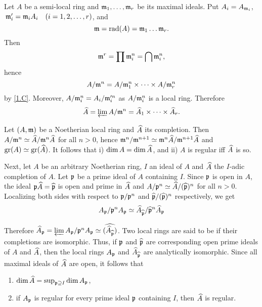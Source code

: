 \documentclass[../main]{subfiles}
\begin{document}
\newparagraph Let $A$ be a semi-local ring and $\mathfrak{m}_1, \dots, \mathfrak{m}_r$ be its maximal ideals. Put $A_i = A_{\mathfrak{m}_i}$, $\,{\ideal m}_i' = {\ideal m}_i A_i\for{i = 1, 2, \ldots, r}$, and \[\mathfrak{m} = \operatorname{rad}(A) = \mathfrak{m}_1 \dots \mathfrak{m}_r.\] Then \[{\mathfrak{m}}^r = \prod \mathfrak{m}_i^n = \bigcap \mathfrak{m}_i^n,\] hence \[A/\mathfrak{m}^n = A/\mathfrak{m}_1^n \times \dots \times A/\mathfrak{m}_r^n\] by \ref{1.C}. Moreover, $A/\mathfrak{m}_i^n = A_i/\mathfrak{m}_i'^n$ as $A/\mathfrak{m}_i^n$ is a local ring. Therefore
\[
\widehat{A} = \varprojlim A/\mathfrak{m}^n = \widehat{A}_1 \times \dots \times \widehat{A}_r.
\]

\newparagraph Let $(A, \mathfrak{m})$ be a Noetherian local ring and $\widehat{A}$ its completion. Then $A/\mathfrak{m}^n \simeq \widehat{A}/\mathfrak{m}^n \widehat{A}$ for all $n > 0$, hence $\mathfrak{m}^n/\mathfrak{m}^{n + 1} \simeq \mathfrak{m}^n \widehat{A}/\mathfrak{m}^{n + 1} \widehat{A}$ and \newline $\operatorname{gr}(A) \simeq \operatorname{gr}(\widehat{A})$. It follows that i) $\operatorname{dim} A = \operatorname{dim} \widehat{A}$, and ii) $A$ is regular iff $\widehat{A}$ is so. 

Next, let $A$ be an arbitrary Noetherian ring, $I$ an ideal of $A$ and $\widehat{A}$ the $I$-adic completion of $A$. Let $\mathfrak{p}$ be a prime ideal of $A$ containing $I$. Since $\mathfrak{p}$ is open in $A$, the ideal $\mathfrak{p} \widehat{A} = \widehat{\mathfrak{p}}$ is open and prime in $\widehat{A}$ and $A/\mathfrak{p}^n \simeq \widehat{A}/(\widehat{\mathfrak{p}})^n$ for all $n > 0$. Localizing both sides with respect to $\mathfrak{p}/\mathfrak{p}^n$ and $\widehat{\mathfrak{p}}/(\widehat{\mathfrak{p}})^n$ respectively, we get
\[
A_{\mathfrak{p}}/\mathfrak{p}^n A_{\mathfrak{p}} \simeq {\widehat{A}}_{\widehat{\mathfrak{p}}}/{\widehat{\mathfrak{p}}}^n \widehat{A}_{\mathfrak{p}}
\]

Therefore ${\widehat{A}}_{\mathfrak{p}} = \varprojlim A_{\mathfrak{p}}/\mathfrak{p}^n A_{\mathfrak{p}} \simeq \widehat{({\widehat{A}}_{\widehat{\mathfrak{p}}})}$. Two local rings are said to be  if their completions are isomorphic. Thus, if $\mathfrak{p}$ and $\widehat{\mathfrak{p}}$ are corresponding open prime ideals of $A$ and $\widehat{A}$, then the local rings $A_{\mathfrak{p}}$ and ${\widehat{A}}_{\widehat{\mathfrak{p}}}$ are analytically isomorphic. Since all maximal ideals of $\widehat{A}$ are open, it follows that

\begin{enumerate}[label=\roman*')]
    \item $\operatorname{dim} \widehat{A} = \sup_{\mathfrak{p} \supseteq I} \operatorname{dim} A_{\mathfrak{p}}$,
    \item if $A_{\mathfrak{p}}$ is regular for every prime ideal $\mathfrak{p}$ containing $I$, then $\widehat{A}$ is regular.
\end{enumerate}
\end{document}
